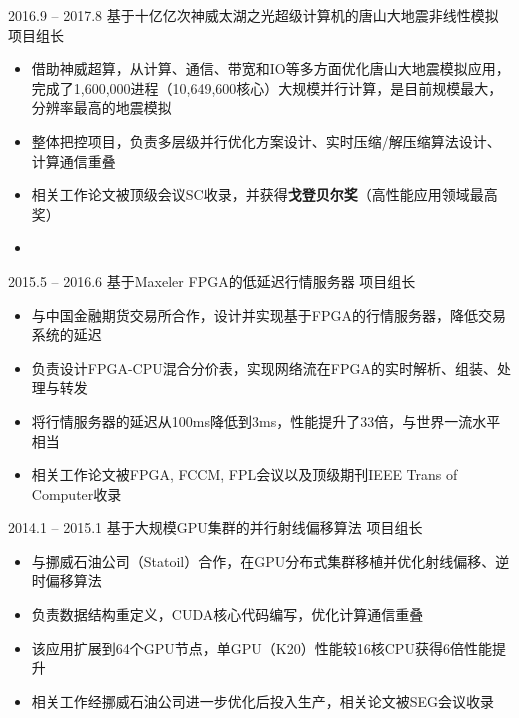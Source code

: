 \documentclass[localFont]{awesome-source-cv} %
\begin{document}
\begin{experiences}
\experience
{2016.9 -- 2017.8}   {基于十亿亿次神威太湖之光超级计算机的唐山大地震非线性模拟     \hspace{3.4cm} 项目组长}{}{}{}
{\begin{itemize}
	\item 借助神威超算，从计算、通信、带宽和IO等多方面优化唐山大地震模拟应用，完成了1,600,000进程（10,649,600核心）大规模并行计算，是目前规模最大，分辨率最高的地震模拟
	\item 整体把控项目，负责多层级并行优化方案设计、实时压缩/解压缩算法设计、计算通信重叠
	\item 相关工作论文被顶级会议SC收录，并获得\textbf{戈登贝尔奖}（高性能应用领域最高奖）
	\item \faGithub {}
\end{itemize}}{}

\emptySeparator
\experience
{2015.5 -- 2016.6}   {基于Maxeler FPGA的低延迟行情服务器     \hspace{7.2cm} 项目组长}{}{}{}
{\begin{itemize}
	\item 与中国金融期货交易所合作，设计并实现基于FPGA的行情服务器，降低交易系统的延迟
	\item 负责设计FPGA-CPU混合分价表，实现网络流在FPGA的实时解析、组装、处理与转发
	\item 将行情服务器的延迟从100ms降低到3ms，性能提升了33倍，与世界一流水平相当
	\item 相关工作论文被FPGA, FCCM, FPL会议以及顶级期刊IEEE Trans of Computer收录
\end{itemize}}{}

\emptySeparator
\experience
{2014.1 -- 2015.1}   {基于大规模GPU集群的并行射线偏移算法     \hspace{6.8cm} 项目组长}{}{}{}
{\begin{itemize}
	\item 与挪威石油公司（Statoil）合作，在GPU分布式集群移植并优化射线偏移、逆时偏移算法
	\item 负责数据结构重定义，CUDA核心代码编写，优化计算通信重叠
	\item 该应用扩展到64个GPU节点，单GPU（K20）性能较16核CPU获得6倍性能提升
	\item 相关工作经挪威石油公司进一步优化后投入生产，相关论文被SEG会议收录
\end{itemize}}{}

\end{experiences}
\end{document}
